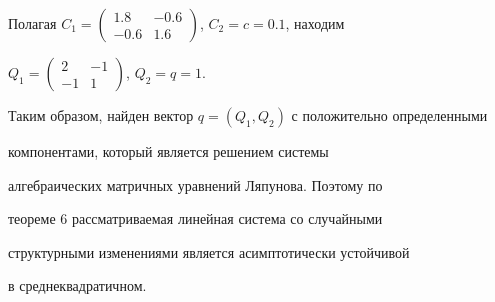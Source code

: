 Полагая $C_1=\left(\begin{smallmatrix}1.8 & -0.6 \\ -0.6 & 1.6 


\end{smallmatrix}\right)$, $C_2=c=0.1$, находим 


$Q_1=\left(\begin{smallmatrix}2 & -1 \\ -1 & 1 


\end{smallmatrix}\right)$, $Q_2=q=1$. 


Таким образом, найден вектор $q=(Q_1,Q_2)$ с положительно определенными 


компонентами, который является решением системы  


алгебраических матричных уравнений Ляпунова. Поэтому по  


теореме 6 рассматриваемая линейная система со случайными  


структурными изменениями является асимптотически устойчивой  


в среднеквадратичном. 


 


